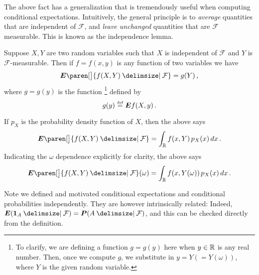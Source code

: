 The above fact has a generalization that is tremendously useful when computing conditional expectations.
Intuitively, the general principle is to \emph{average} quantities that are independent of $\mathcal F$, and \emph{leave unchanged} quantities that are $\mathcal F$ measurable.
This is known as the independence lemma.
\begin{lemma}
  Suppose $X, Y$ are two random variables such that $X$ is independent of $\mathcal F$ and $Y$ is $\mathcal F$-measurable.
  Then if $f = f(x, y)$ is any function of two variables we have
  \begin{equation*}
    \E \paren[\big]{ f(X, Y) \given \mathcal F}
      = g(Y)\,,
  \end{equation*}
  where $g = g(y)$ is the function%
  \footnote{%
    To clarify, we are defining a function $g = g(y)$ here when $y \in \mathbb{R}$ is any real number.
    Then, once we compute $g$, we substitute in $y = Y (= Y(\omega))$, where $Y$ is the given random variable.%
  }
  defined by
  \begin{equation*}
    g(y) \stackrel{\scriptscriptstyle\textup{def}}{=} \bm{E} f(X, y)\,.
  \end{equation*}
\end{lemma}

\begin{remark*}
  If $p_X$ is the probability density function of $X$, then the above says
  \begin{equation*}
    \E\paren[\big]{ f(X, Y) \given \mathcal F}
      = \int_\R f(x, Y) \, p_X(x) \, dx\,.
  \end{equation*}
  Indicating the $\omega$ dependence explicitly for clarity, the above says
  \begin{equation*}
    \E\paren[\big]{ f(X, Y) \given \mathcal F}(\omega)
      = \int_\R f(x, Y(\omega)) \, p_X(x) \, dx\,.
  \end{equation*}
\end{remark*}
\iffalse
\begin{remark}
  In Lebesgue integral notation (with the $\omega$ dependence explicitly indicated) this simply says that
  \begin{equation*}
    \E( f(X, Y) \given \mathcal F )(\omega)
      = \int_\Omega f( X(\xi), Y(\omega) ) \, d\P(\xi)\,.
  \end{equation*}
\end{remark}
\fi


\begin{remark}
  Note we defined and motivated conditional expectations and conditional probabilities independently.
  They are however intrinsically related:
  Indeed, $\E( \one_A \given \mathcal F) = \P( A \given \mathcal F)$, and this can be checked directly from the definition.
\end{remark}

